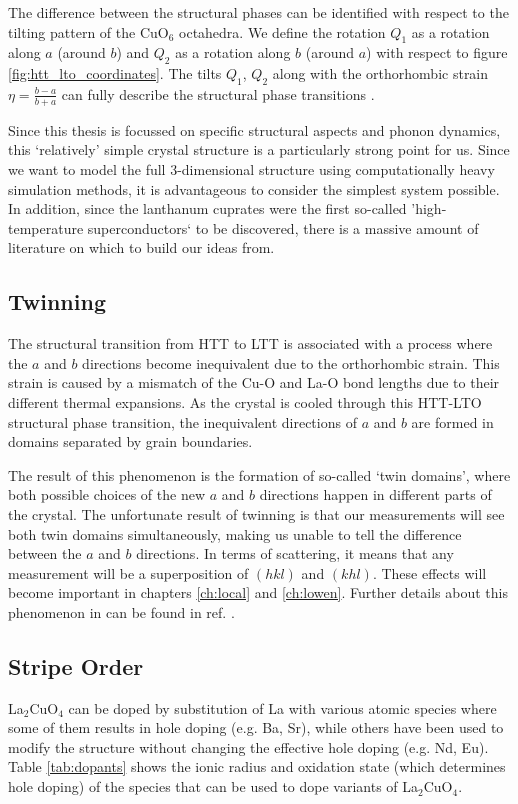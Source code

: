 The difference between the structural phases can be identified with respect to the tilting pattern of the CuO$_6$ octahedra. We define the rotation $Q_1$ as a rotation along $a$ (around $b$) and $Q_2$ as a rotation along $b$ (around $a$) with respect to figure \ref{fig:htt_lto_coordinates}. The tilts $Q_1$, $Q_2$ along with the orthorhombic strain $\eta = \frac{b-a}{b+a}$ can fully describe the structural phase transitions \cite{Axe1989}.

Since this thesis is focussed on specific structural aspects and phonon dynamics, this `relatively' simple crystal structure is a particularly strong point for us. Since we want to model the full 3-dimensional structure using computationally heavy simulation methods, it is advantageous to consider the simplest system possible. In addition, since the lanthanum cuprates were the first so-called 'high-temperature superconductors` to be discovered, there is a massive amount of literature on which to build our ideas from.

\subsection{Twinning}
The structural transition from HTT to LTT is associated with a process where the $a$ and $b$ directions become inequivalent due to the orthorhombic strain. This strain is caused by a mismatch of the Cu-O and La-O bond lengths due to their different thermal expansions. As the crystal is cooled through this HTT-LTO structural phase transition, the inequivalent directions of $a$ and $b$ are formed in domains separated by grain boundaries.

The result of this phenomenon is the formation of so-called `twin domains', where both possible choices of the new $a$ and $b$ directions happen in different parts of the crystal. The unfortunate result of twinning is that our measurements will see both twin domains simultaneously, making us unable to tell the difference between the $a$ and $b$ directions. In terms of scattering, it means that any measurement will be a superposition of $(hkl)$ and $(khl)$. These effects will become important in chapters \ref{ch:local} and \ref{ch:lowen}. Further details about this phenomenon in \LSCO{} can be found in ref. \cite{Braden1992}.

\subsection{Stripe Order}
La$_2$CuO$_4$ can be doped by substitution of La with various atomic species where some of them results in hole doping (e.g. Ba, Sr), while others have been used to modify the structure without changing the effective hole doping (e.g. Nd, Eu). Table \ref{tab:dopants} shows the ionic radius and oxidation state (which determines hole doping) of the species that can be used to dope variants of La$_2$CuO$_4$.

